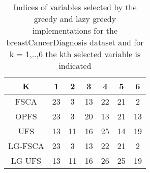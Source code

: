 \begin{table}
	\begin{center}
		\begin{tabular}{c c c c c c c}
			K & 1 & 2 & 3 & 4 & 5 & 6 \\
			\hline
			FSCA & 23 & 3 & 13 & 22 & 21 & 2 \\
			OPFS & 23 & 3 & 20 & 13 & 21 & 13 \\
			UFS & 13 & 11 & 16 & 25 & 14 & 19 \\
			LG-FSCA & 23 & 3 & 13 & 22 & 21 & 2 \\
			LG-UFS & 13 & 11 & 16 & 26 & 25 & 19 \\
		\end{tabular}
	\end{center}
	\caption{Indices of variables selected by the greedy and lazy greedy implementations for the breastCancerDiagnosis dataset and for k = 1,..,6 the kth selected variable is indicated}
\end{table}